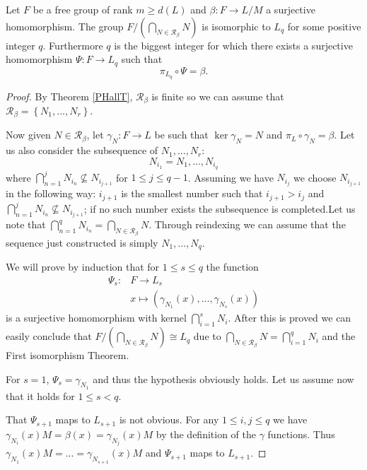 \begin{theorem}
    \label{QF}
    Let $F$ be a free group of rank $m \ge d(L)$ and $\beta \colon F \rightarrow L/M$ a surjective homomorphism. The group $F/(\bigcap_{N \in \mathscr{R}_\beta}N)$ is isomorphic to $L_q$ for some positive integer $q$. Furthermore $q$ is the biggest integer for which there exists a surjective homomorphism $\Psi \colon F \rightarrow L_q$ such that 
    $$ 
    \pi_{L_q} \circ \Psi = \beta.
    $$
\end{theorem}

\begin{proof}
    By Theorem \ref{PHallT}, $\mathscr{R}_\beta$ is finite so we can assume that $\mathscr{R}_\beta = \left\{ N_1,...,N_r \right\}$.

    Now given $N \in \mathscr{R}_\beta$, let $\gamma_N \colon F \rightarrow L$ be such that $\ker \gamma_N = N$ and $\pi_L \circ \gamma_N = \beta$. Let us also consider the subsequence of $N_1, ..., N_r$:
    $$N_{i_1} = N_1, ..., N_{i_q}$$
    where $\bigcap_{n=1}^{j}N_{i_n} \nsubseteq N_{i_{j+1}}$ for $1 \le j \le q-1$. Assuming we have $N_{i_j}$ we choose $N_{i_{j+1}}$ in the following way: $i_{j+1}$ is the smallest number such that $i_{j+1} > i_j$ and $\bigcap_{n=1}^{j}N_{i_n} \nsubseteq N_{i_{j+1}}$; if no such number exists the subsequence is completed.Let us note that $\bigcap_{n = 1}^{q}N_{i_n} = \bigcap_{N \in \mathscr{R}_\beta}N$.
    Through reindexing we can assume that the sequence just constructed is simply $N_1,...,N_q$.
    
    We will prove by induction that for $1 \le s \le q$ the function
    \begin{align*}
        \Psi_s \colon &F \rightarrow L_s \\
                    &x \mapsto (\gamma_{N_1}(x), ... , \gamma_{N_s}(x))
    \end{align*}
    is a surjective homomorphism with kernel $\bigcap_{i=1}^s N_i$. After this is proved we can easily conclude that $F/(\bigcap_{N \in \mathscr{R}_\beta}N) \cong L_q$ due to $\bigcap_{N \in \mathscr{R}_\beta}N = \bigcap_{i=1}^q N_i$ and the First isomorphism Theorem.
    
    For $s = 1$, $\Psi_s = \gamma_{N_1}$ and thus the hypothesis obviously holds. Let us assume now that it holds for $1 \le s < q$.

    That $\Psi_{s+1}$ maps to $L_{s+1}$ is not obvious. For any $1 \le i,j \le q$ we have $\gamma_{N_i}(x)M = \beta(x) = \gamma_{N_j}(x)M$ by the definition of the $\gamma$ functions. Thus $\gamma_{N_1}(x)M = ... = \gamma_{N_{s+1}}(x)M$ and $\Psi_{s+1}$ maps to $L_{s+1}$.


\end{proof}
